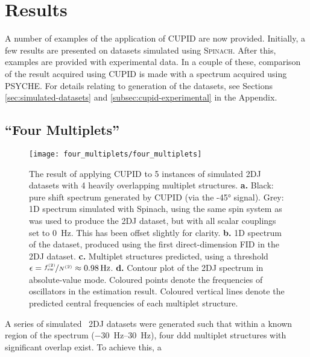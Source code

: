 \section{Results}
\label{subsec:cupid-results}
A number of examples of the application of \ac{CUPID} are now provided.
Initially, a few results are presented on datasets simulated using
\textsc{Spinach}. After this, examples are provided with experimental data. In
a couple of these, comparison of the result acquired using \ac{CUPID} is
made with a spectrum acquired using \ac{PSYCHE}. For details relating to
generation of the datasets, see Sections \ref{sec:simulated-datasets} and
\ref{subsec:cupid-experimental} in the Appendix.

\subsection{``Four Multiplets''}
\label{subsec:four-mp}
\begin{figure}
    \centering
    \texttt{[image: four\_multiplets/four\_multiplets]}
    \caption[
        The result of applying \acs{CUPID} to 5 instances of simulated
        \acs{2DJ} datasets with 4 heavily overlapping multiplet structures.
    ]{
        The result of applying \ac{CUPID} to 5 instances of simulated \ac{2DJ}
        datasets with 4 heavily overlapping multiplet structures.
        \textbf{a.} Black: pure shift spectrum generated by \ac{CUPID} (via the
        \ang{-45} signal).
        Grey: \ac{1D} spectrum simulated with Spinach, using the same spin
        system as was used to produce the \ac{2DJ} dataset, but with all scalar
        couplings set to \qty{0}{\hertz}. This has been offset slightly for
        clarity.
        \textbf{b.} \ac{1D} spectrum of the dataset, produced using the first
        direct-dimension \ac{FID} in the \ac{2DJ} dataset.
        \textbf{c.} Multiplet structures predicted, using a threshold $\epsilon
        = \nicefrac{f_{\mathrm{sw}}^{(2)}}{N^{(2)}} \approx \qty{0.98}{\hertz}$.
        \textbf{d.} Contour plot of the \ac{2DJ} spectrum in absolute-value
        mode. Coloured points denote the frequencies of oscillators in the
        estimation result.
        Coloured vertical lines denote the predicted central frequencies of
        each multiplet structure.
    }
    \label{fig:four-multiplets}
\end{figure}
A series of simulated \proton\ \ac{2DJ} datasets were generated such that
within a known region of the spectrum (\SIrange{-30}{30}{\hertz}), four ddd
multiplet structures with significant overlap exist. To achieve this, a
